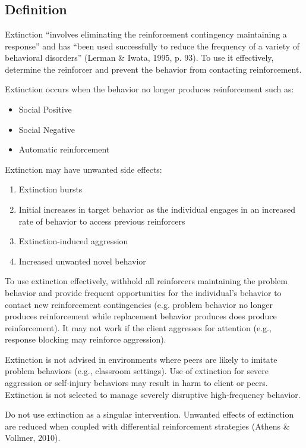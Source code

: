 \clearpage \section{\fourdEighteen{}}
\subsection{Definition}
Extinction ``involves eliminating the reinforcement contingency maintaining a response'' and has ``been used successfully to reduce the frequency of a variety of behavioral disorders'' (Lerman \& Iwata, 1995, p. 93). To use it effectively, determine the reinforcer and prevent the behavior from contacting reinforcement. 

Extinction occurs when the behavior no longer produces reinforcement such as:
\begin{itemize}
\item Social Positive
\item Social Negative
\item Automatic reinforcement 
\end{itemize}

Extinction may have unwanted side effects:
\begin{enumerate}
\item Extinction bursts
\item Initial increases in target behavior as the individual engages in an increased rate of behavior to access previous reinforcers
\item Extinction-induced aggression
\item Increased unwanted novel behavior
\end{enumerate}

To use extinction effectively, withhold all reinforcers maintaining the problem behavior and provide frequent opportunities for the individual's behavior to contact new reinforcement contingencies (e.g. problem behavior no longer produces reinforcement while replacement behavior produces does produce reinforcement). It may not work if the client aggresses for attention (e.g., response blocking may reinforce aggression).

Extinction is not advised in environments where peers are likely to imitate problem behaviors (e.g., classroom settings). Use of extinction for severe aggression or self-injury behaviors may result in harm to client or peers. Extinction is not selected to manage severely disruptive high-frequency behavior.

Do not use extinction as a singular intervention. Unwanted effects of extinction are reduced when coupled with differential reinforcement strategies (Athens \& Vollmer, 2010).
%
